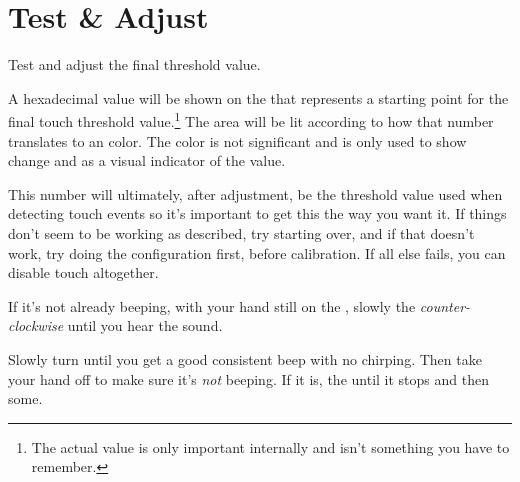 
\section{Test \& Adjust} \label{Test and Adjust} 

Test and adjust the final threshold value.

\par\medskip

A hexadecimal value will be shown on the  that represents a starting
point for the final touch threshold value.\footnote{ The actual value is only
important internally and isn't something you have to remember.} The  area
will be lit according to how that number translates to an  color.  The
color is not significant and is only used to show change and as a visual
indicator of the value.

\par\medskip

This number will ultimately, after adjustment, be the threshold value used when
detecting touch events so it's important to get this the way you want it.  If
things don't seem to be working as described, try starting over, and if that
doesn't work, try doing the configuration first, before calibration.  If all
else fails, you can disable touch altogether.

\par\medskip

If it's not already beeping, with your hand still on the , slowly 
the  \textit{counter-clockwise} until you hear the
\hyperref[Beeper]{} sound.


Slowly turn until you get a good consistent beep with no chirping.  Then take
your hand off to make sure it's \textit{not} beeping.  If it is,  the
  until it stops and then some.


